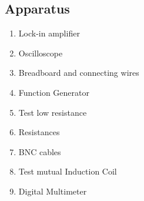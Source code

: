 \subsection*{Apparatus}

\begin{enumerate}
    \item Lock-in amplifier
    \item Oscilloscope
    \item Breadboard and connecting wires
    \item Function Generator
    \item Test low resistance
    \item Resistances
    \item BNC cables
    \item Test mutual Induction Coil
    \item Digital Multimeter
\end{enumerate}